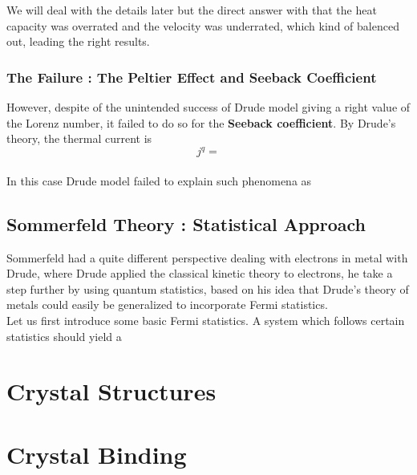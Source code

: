\documentclass[paper=a4, fontsize=11pt]{scrartcl}
\begin{document}
We will deal with the details later but the direct answer with that the heat capacity was overrated and the velocity was underrated, which kind of balenced out, leading the right results.\\

\vspace{0.15in}
\subsubsection{The Failure : The Peltier Effect and Seeback Coefficient }
\vspace{0.15in}

However, despite of the unintended success of Drude model giving a right value of the Lorenz number, it failed to do so for the \textbf{Seeback coefficient}. By Drude's theory, the thermal current is \\

\begin{equation}\nonumber
	j^q = 
\end{equation} \\

In this case Drude model failed to explain such phenomena as 

\vspace{0.15in}
\subsection{Sommerfeld Theory : Statistical Approach}
\vspace{0.15in}

Sommerfeld had a quite different perspective dealing with electrons in metal with Drude, where Drude applied the classical kinetic theory to electrons, he take a step further by using quantum statistics, based on his idea that Drude’s theory of metals could easily be generalized to incorporate Fermi statistics.\\

Let us first introduce some basic Fermi statistics. A system which follows certain statistics should yield a 

\vspace{0.25in}
\section{Crystal Structures}
\vspace{0.25in}

\vspace{0.25in}
\section{Crystal Binding}
\vspace{0.25in}
\end{document}
